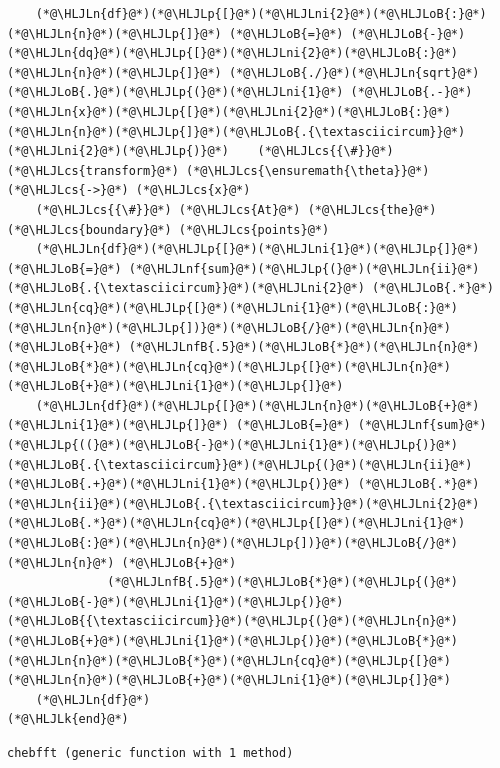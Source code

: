 \documentclass[12pt,a4paper]{article}
\newcommand{\HLJLk}[1]{\textcolor[RGB]{148,91,176}{\textbf{#1}}}
\newcommand{\HLJLn}[1]{#1}
\newcommand{\HLJLnf}[1]{\textcolor[RGB]{66,102,213}{#1}}
\newcommand{\HLJLnfB}[1]{\textcolor[RGB]{59,151,46}{#1}}
\newcommand{\HLJLni}[1]{\textcolor[RGB]{59,151,46}{#1}}
\newcommand{\HLJLoB}[1]{\textcolor[RGB]{102,102,102}{\textbf{#1}}}
\newcommand{\HLJLp}[1]{#1}
\newcommand{\HLJLcs}[1]{\textcolor[RGB]{153,153,119}{\textit{#1}}}
\begin{document}
\begin{lstlisting}
    (*@\HLJLn{df}@*)(*@\HLJLp{[}@*)(*@\HLJLni{2}@*)(*@\HLJLoB{:}@*)(*@\HLJLn{n}@*)(*@\HLJLp{]}@*) (*@\HLJLoB{=}@*) (*@\HLJLoB{-}@*)(*@\HLJLn{dq}@*)(*@\HLJLp{[}@*)(*@\HLJLni{2}@*)(*@\HLJLoB{:}@*)(*@\HLJLn{n}@*)(*@\HLJLp{]}@*) (*@\HLJLoB{./}@*)(*@\HLJLn{sqrt}@*)(*@\HLJLoB{.}@*)(*@\HLJLp{(}@*)(*@\HLJLni{1}@*) (*@\HLJLoB{.-}@*) (*@\HLJLn{x}@*)(*@\HLJLp{[}@*)(*@\HLJLni{2}@*)(*@\HLJLoB{:}@*)(*@\HLJLn{n}@*)(*@\HLJLp{]}@*)(*@\HLJLoB{.{\textasciicircum}}@*)(*@\HLJLni{2}@*)(*@\HLJLp{)}@*)    (*@\HLJLcs{{\#}}@*) (*@\HLJLcs{transform}@*) (*@\HLJLcs{\ensuremath{\theta}}@*) (*@\HLJLcs{->}@*) (*@\HLJLcs{x}@*)   
    (*@\HLJLcs{{\#}}@*) (*@\HLJLcs{At}@*) (*@\HLJLcs{the}@*) (*@\HLJLcs{boundary}@*) (*@\HLJLcs{points}@*)
    (*@\HLJLn{df}@*)(*@\HLJLp{[}@*)(*@\HLJLni{1}@*)(*@\HLJLp{]}@*) (*@\HLJLoB{=}@*) (*@\HLJLnf{sum}@*)(*@\HLJLp{(}@*)(*@\HLJLn{ii}@*)(*@\HLJLoB{.{\textasciicircum}}@*)(*@\HLJLni{2}@*) (*@\HLJLoB{.*}@*)(*@\HLJLn{cq}@*)(*@\HLJLp{[}@*)(*@\HLJLni{1}@*)(*@\HLJLoB{:}@*)(*@\HLJLn{n}@*)(*@\HLJLp{])}@*)(*@\HLJLoB{/}@*)(*@\HLJLn{n}@*) (*@\HLJLoB{+}@*) (*@\HLJLnfB{.5}@*)(*@\HLJLoB{*}@*)(*@\HLJLn{n}@*)(*@\HLJLoB{*}@*)(*@\HLJLn{cq}@*)(*@\HLJLp{[}@*)(*@\HLJLn{n}@*)(*@\HLJLoB{+}@*)(*@\HLJLni{1}@*)(*@\HLJLp{]}@*)     
    (*@\HLJLn{df}@*)(*@\HLJLp{[}@*)(*@\HLJLn{n}@*)(*@\HLJLoB{+}@*)(*@\HLJLni{1}@*)(*@\HLJLp{]}@*) (*@\HLJLoB{=}@*) (*@\HLJLnf{sum}@*)(*@\HLJLp{((}@*)(*@\HLJLoB{-}@*)(*@\HLJLni{1}@*)(*@\HLJLp{)}@*) (*@\HLJLoB{.{\textasciicircum}}@*)(*@\HLJLp{(}@*)(*@\HLJLn{ii}@*) (*@\HLJLoB{.+}@*)(*@\HLJLni{1}@*)(*@\HLJLp{)}@*) (*@\HLJLoB{.*}@*) (*@\HLJLn{ii}@*)(*@\HLJLoB{.{\textasciicircum}}@*)(*@\HLJLni{2}@*) (*@\HLJLoB{.*}@*)(*@\HLJLn{cq}@*)(*@\HLJLp{[}@*)(*@\HLJLni{1}@*)(*@\HLJLoB{:}@*)(*@\HLJLn{n}@*)(*@\HLJLp{])}@*)(*@\HLJLoB{/}@*)(*@\HLJLn{n}@*) (*@\HLJLoB{+}@*)
              (*@\HLJLnfB{.5}@*)(*@\HLJLoB{*}@*)(*@\HLJLp{(}@*)(*@\HLJLoB{-}@*)(*@\HLJLni{1}@*)(*@\HLJLp{)}@*)(*@\HLJLoB{{\textasciicircum}}@*)(*@\HLJLp{(}@*)(*@\HLJLn{n}@*)(*@\HLJLoB{+}@*)(*@\HLJLni{1}@*)(*@\HLJLp{)}@*)(*@\HLJLoB{*}@*)(*@\HLJLn{n}@*)(*@\HLJLoB{*}@*)(*@\HLJLn{cq}@*)(*@\HLJLp{[}@*)(*@\HLJLn{n}@*)(*@\HLJLoB{+}@*)(*@\HLJLni{1}@*)(*@\HLJLp{]}@*)
    (*@\HLJLn{df}@*)
(*@\HLJLk{end}@*)
\end{lstlisting}

\begin{lstlisting}
chebfft (generic function with 1 method)
\end{lstlisting}
\end{document}
